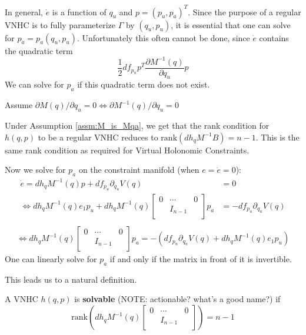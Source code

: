 In general, \(\dot{e}\) is a function of \(q_u\) and \(p = (p_u,p_a)^T\). Since the purpose of a regular VNHC is to fully parameterize \(\Gamma\) by \((q_u,p_u)\), it is essential that one can solve for \(p_a = p_a(q_u,p_u)\). Unfortunately this often cannot be done, since \(\dot{e}\) contains the quadratic term
\[
\frac{1}{2} df_{p_u} p^T \frac{\partial M^{-1}(q)}{\partial q_u} p 
\]
We can solve for \(p_a\) if this quadratic term does not exist.
\begin{assm}\label{assm:M_is_Mqa}
Assume \(\partial M(q) / \partial q_u = 0 \Leftrightarrow \partial M^{-1}(q) / \partial q_u = 0\)
\end{assm}

Under Assumption \ref{assm:M_is_Mqa}, we get that the rank condition for \(h(q,p)\) to be a regular VNHC reduces to \(\text{rank}\left(dh_q M^{-1} B\right) = n - 1\). This is the same rank condition as required for Virtual Holonomic Constraints.

Now we solve for \(p_a\) on the constraint manifold (when \(e = \dot{e} = 0\)):
\begin{align*}
    \dot{e} = dh_q M^{-1}(q)p + df_{p_u} \partial_{q_u}V(q) &= 0\\
    \Leftrightarrow dh_q M^{-1}(q)e_1 p_u + dh_q M^{-1}(q) \begin{bmatrix}
    0 & \cdots & 0 \\
    & I_{n-1} & \\
    \end{bmatrix} p_a &= -df_{p_u} \partial_{q_u}V(q) \\
\end{align*}
\begin{align*}
    \Leftrightarrow dh_q M^{-1}(q) \begin{bmatrix}
    0 & \cdots & 0 \\
    & I_{n-1} & \\
    \end{bmatrix} p_a = -\left(df_{p_u}\partial_{q_u}V(q) + dh_q M^{-1}(q)e_1 p_u\right)
\end{align*}
One can linearly solve for \(p_a\) if and only if the matrix in front of it is invertible.

This leads us to a natural definition.
\begin{defn}\label{defn:solvability}
A VNHC \(h(q,p)\) is \textbf{solvable} (NOTE: actionable? what's a good name?) if
\[
\text{rank}\left(dh_q M^{-1}(q) \begin{bmatrix}
    0 & \cdots & 0 \\
    & I_{n-1} & \\
    \end{bmatrix}\right) = n - 1
\]
\end{defn}

